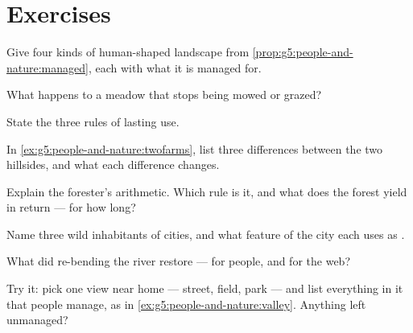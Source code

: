 \section{Exercises}

\begin{exercise}[$\star$]\label{exo:g5:people-and-nature:1}
Give four kinds of human-shaped landscape from
\cref{prop:g5:people-and-nature:managed}, each with what it
is managed for.
\end{exercise}

\begin{exercise}[$\star$]\label{exo:g5:people-and-nature:2}
What happens to a meadow that stops being mowed or grazed?
\end{exercise}

\begin{exercise}[$\star$]\label{exo:g5:people-and-nature:3}
State the three rules of lasting use.
\end{exercise}

\begin{exercise}[$\star$]\label{exo:g5:people-and-nature:4}
In \cref{ex:g5:people-and-nature:twofarms}, list three
differences between the two hillsides, and what each
difference changes.
\end{exercise}

\begin{exercise}[$\star$]\label{exo:g5:people-and-nature:5}
Explain the forester's arithmetic. Which rule is it, and
what does the forest yield in return --- for how long?
\end{exercise}

\begin{exercise}[$\star$]\label{exo:g5:people-and-nature:6}
Name three wild inhabitants of cities, and what feature of
the city each uses as .
\end{exercise}

\begin{exercise}[$\star$]\label{exo:g5:people-and-nature:7}
What did re-bending the river restore --- for people, and
for the web?
\end{exercise}

\begin{exercise}[$\star$]\label{exo:g5:people-and-nature:8}
Try it: pick one view near home --- street, field, park ---
and list everything in it that people manage, as in
\cref{ex:g5:people-and-nature:valley}. Anything left
unmanaged?
\end{exercise}


